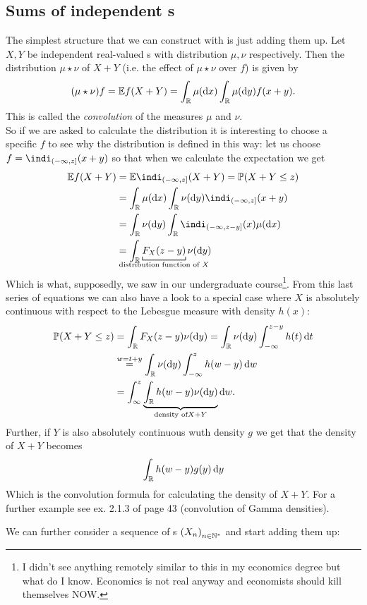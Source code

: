 \documentclass{report}
\begin{document}
\subsection{Sums of independent \rv s}
The simplest structure that we can construct with \rv is just adding them up. Let $X,Y$ be independent real-valued \rv s with distribution $\mu,\nu$ respectively. Then the distribution $\mu\star\nu$ of $X+Y$ (i.e. the effect of $\mu\star\nu$ over $f$) is given by
\[(\mu\star\nu)f=\mathbb{E} f(X+Y)=\int_{\mathbb{R}}\mu(\mathop{}\!\mathrm{d} x)\int_{\mathbb{R}}\mu(\mathop{}\!\mathrm{d} y)f(x+y).\]
This is called the \emph{convolution} of the measures $\mu$ and $\nu$.\\
 So if we are asked to calculate the distribution it is interesting to choose a specific $f$ to see why the distribution is defined in this way: let us choose $f=\indi_{(-\infty,z]}(x+y)$ so that when we calculate the expectation we get
\begin{align*}
	\ev f(X+Y)&=\ev \indi_{(-\infty,z]}(X+Y)=\pr(X+Y\leq z)\\
	&=\int_{\R}\mu(\dx)\int_{\R}\nu(\dy)\indi_{(-\infty,z]}(x+y)\\
	&=\int_{\R}\nu(\dy)\int_{\R}\indi_{(-\infty,z-y]}(x)\mu(\dx)\\
	&=\int_{\R}\underbracket[0.6pt]{F_X(z-y)}_{\mathclap{\text{distribution function of }X}}\nu(\dy)
\end{align*}
Which is what, supposedly, we saw in our undergraduate course\footnote{I didn't see anything remotely similar to this in my economics degree but what do I know. Economics is not real anyway and economists should kill themselves NOW.}.
From this last series of equations we can also have a look to a special case where $X$ is absolutely continuous with respect to the Lebesgue measure with density $h(x)$:
\begin{align*}
	\mathbb{P}(X+Y\leq z)&=\int_{\mathbb{R}}F_X(z-y)\nu(\mathop{}\!\mathrm{d} y)=\int_{\mathbb{R}}\nu(\mathop{}\!\mathrm{d} y)\int_{-\infty}^{z-y}h(t)\mathop{}\!\mathrm{d} t\\
	&\stackrel{w=t+y}{=}\int_{\mathbb{R}}\nu(\mathop{}\!\mathrm{d} y)\int_{-\infty}^{z}h(w-y)\mathop{}\!\mathrm{d} w\\
	&=\int_{\infty}^{z}\underbrace{\int_{\mathbb{R}}h(w-y)\nu(\mathop{}\!\mathrm{d} y)}_{\text{density of} X+Y}\mathop{}\!\mathrm{d} w.
\end{align*}
Further, if $Y$ is also absolutely continuous wuth density $g$ we get that the density of $X+Y$ becomes
\[\int_{\mathbb{R}}h(w-y)g(y)\mathop{}\!\mathrm{d} y\]
Which is the convolution formula for calculating the density of $X+Y$. 
For a further example see ex. 2.1.3 of \cinlar page 43 (convolution of Gamma densities).\par
We can further consider a sequence of \rv s ${(X_n)}_{n\in\mathbb{N}^{*}}$ and start adding them up:
\end{document}

